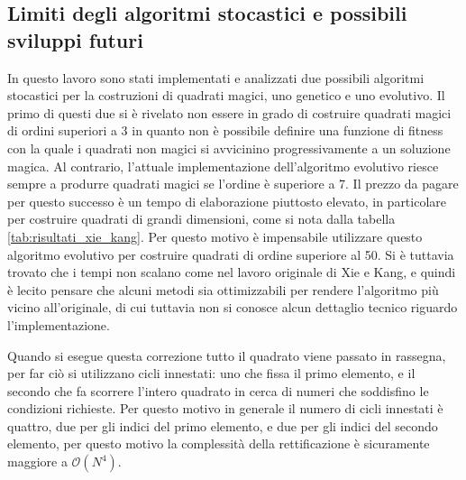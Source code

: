 \documentclass[italian,twoside,twocolumn]{article}
\begin{document}
\subsection{Limiti degli algoritmi stocastici e possibili sviluppi futuri}
In questo lavoro sono stati implementati e analizzati due possibili algoritmi stocastici per la costruzioni di quadrati magici, uno genetico e uno evolutivo. Il primo di questi due si è rivelato non essere in grado di costruire quadrati magici di ordini superiori a 3 in quanto non è possibile definire una funzione di fitness con la quale i quadrati non magici si avvicinino progressivamente a un soluzione magica. 
Al contrario, l'attuale implementazione dell'algoritmo evolutivo riesce sempre a produrre quadrati magici se l'ordine è superiore a 7. Il prezzo da pagare per questo successo è un tempo di elaborazione piuttosto elevato, in particolare per costruire quadrati di grandi dimensioni, come si nota dalla tabella \ref{tab:risultati_xie_kang}. Per questo motivo è impensabile utilizzare questo algoritmo evolutivo per costruire quadrati di ordine superiore al 50. Si è tuttavia trovato che i tempi non scalano come nel lavoro originale di Xie e Kang, e quindi è lecito pensare che alcuni metodi sia ottimizzabili per rendere l'algoritmo più vicino all'originale, di cui tuttavia non si conosce alcun dettaglio tecnico riguardo l'implementazione. 

Quando si esegue questa correzione tutto il quadrato viene passato in rassegna, per far ciò si utilizzano cicli innestati: uno che fissa il primo elemento, e il secondo che fa scorrere l'intero quadrato in cerca di numeri che soddisfino le condizioni richieste. Per questo motivo in generale il numero di cicli innestati è quattro, due per gli indici del primo elemento, e due per gli indici del secondo elemento, per questo motivo la complessità della rettificazione è sicuramente maggiore a $\mathcal{O}(N^4)$. 
\end{document}
